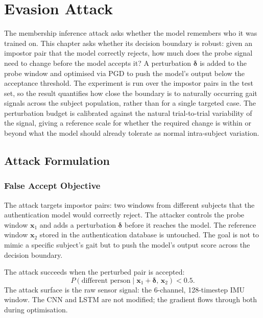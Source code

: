 \chapter{Evasion Attack}
\label{ch:evasion}

The membership inference attack asks whether the model remembers who it was trained on. This chapter asks whether its decision boundary is robust: given an impostor pair that the model correctly rejects, how much does the probe signal need to change before the model accepts it? A perturbation $\boldsymbol{\delta}$ is added to the probe window and optimised via PGD to push the model's output below the acceptance threshold. The experiment is run over the impostor pairs in the test set, so the result quantifies how close the boundary is to naturally occurring gait signals across the subject population, rather than for a single targeted case. The perturbation budget is calibrated against the natural trial-to-trial variability of the signal, giving a reference scale for whether the required change is within or beyond what the model should already tolerate as normal intra-subject variation.

\section{Attack Formulation}
\label{sec:ev_formulation}

\subsection{False Accept Objective}
\label{ssec:ev_objective}

The attack targets impostor pairs: two windows from different subjects that the authentication model would correctly reject. The attacker controls the probe window $\mathbf{x}_1$ and adds a perturbation $\boldsymbol{\delta}$ before it reaches the model. The reference window $\mathbf{x}_2$ stored in the authentication database is untouched. The goal is not to mimic a specific subject's gait but to push the model's output score across the decision boundary.

The attack succeeds when the perturbed pair is accepted:
\begin{equation}
  P\!\left(\text{different person} \mid \mathbf{x}_1 + \boldsymbol{\delta},\,
  \mathbf{x}_2\right) < 0.5.
\end{equation}
The attack surface is the raw sensor signal: the 6-channel, 128-timestep IMU window. The CNN and LSTM are not modified; the gradient flows through both during optimisation.

